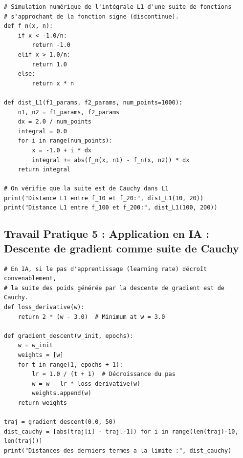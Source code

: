 \documentclass[11pt,a4paper]{article}
\begin{document}
\begin{lstlisting}
# Simulation numérique de l'intégrale L1 d'une suite de fonctions
# s'approchant de la fonction signe (discontinue).
def f_n(x, n):
    if x < -1.0/n:
        return -1.0
    elif x > 1.0/n:
        return 1.0
    else:
        return x * n

def dist_L1(f1_params, f2_params, num_points=1000):
    n1, n2 = f1_params, f2_params
    dx = 2.0 / num_points
    integral = 0.0
    for i in range(num_points):
        x = -1.0 + i * dx
        integral += abs(f_n(x, n1) - f_n(x, n2)) * dx
    return integral

# On vérifie que la suite est de Cauchy dans L1
print("Distance L1 entre f_10 et f_20:", dist_L1(10, 20))
print("Distance L1 entre f_100 et f_200:", dist_L1(100, 200))

\end{lstlisting}


\subsection*{Travail Pratique 5 : Application en IA : Descente de gradient comme suite de Cauchy}

\begin{lstlisting}
# En IA, si le pas d'apprentissage (learning rate) décroît convenablement,
# la suite des poids générée par la descente de gradient est de Cauchy.
def loss_derivative(w):
    return 2 * (w - 3.0)  # Minimum at w = 3.0

def gradient_descent(w_init, epochs):
    w = w_init
    weights = [w]
    for t in range(1, epochs + 1):
        lr = 1.0 / (t + 1)  # Décroissance du pas
        w = w - lr * loss_derivative(w)
        weights.append(w)
    return weights

traj = gradient_descent(0.0, 50)
dist_cauchy = [abs(traj[i] - traj[-1]) for i in range(len(traj)-10, len(traj))]
print("Distances des derniers termes a la limite :", dist_cauchy)

\end{lstlisting}
\end{document}
